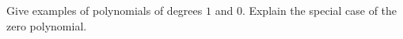 Give examples of polynomials of degrees $1$ and $0$. Explain the special case of the zero polynomial.

